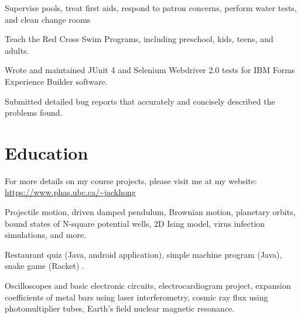 \documentclass[]{deedy-resume-openfont}
\begin{document}
\begin{tightemize}
\item Supervise pools, treat first aids, respond to patron concerns, perform water tests, and clean change rooms
\item Teach the Red Cross Swim Programs, including preschool, kids, teens, and adults.
\end{tightemize}
\sectionsep

\begin{tightemize}
\item Wrote and maintained JUnit 4 and Selenium Webdriver 2.0 tests for IBM Forms Experience Builder software.
\item Submitted detailed bug reports that accurately and concisely described the problems found.
\end{tightemize}
\sectionsep


\section{Education}
For more details on my course projects, please visit me at my website: \url{https://www.phas.ubc.ca/~jackhong}

Projectile motion, driven damped pendulum, Brownian motion, planetary orbits, bound states of N-square potential wells, 2D Ising model, virus infection simulations, and more.

Restaurant quiz (Java, android application), simple machine program (Java), snake game (Racket) .

Oscilloscopes and basic electronic circuits, electrocardiogram project, expansion coefficients of metal bars using laser interferometry, cosmic ray flux using photomultiplier tubes, Earth's field nuclear magnetic resonance.
\sectionsep
\end{document}
